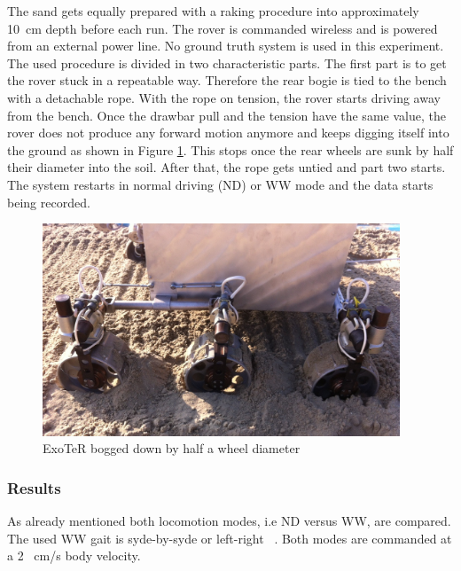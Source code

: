 \documentclass[a4paper,twocolumn]{esapub2005} %
\begin{document}

The sand gets equally prepared with a raking procedure into approximately
10~\unit{cm} depth before each run.  The rover is commanded wireless
and is powered from an external power line. No ground truth system is used in this experiment. The
used procedure is divided in two characteristic parts. The first part is to get
the rover stuck in a repeatable way. Therefore the rear bogie is tied to the
bench with a detachable rope. With the rope on tension, the rover starts
driving away from the bench. Once the drawbar pull and the tension have the
same value, the rover does not produce any forward motion anymore and keeps
digging itself into the ground as shown in Figure \ref{fig:volleyexoterdigg}.
This stops once the rear wheels are sunk by half their diameter into the soil.
After that, the rope gets untied and part two starts. The system restarts in
normal driving (ND) or WW mode and the data starts being recorded. 

\begin{figure}[h!]
    \centering
    \includegraphics[width=0.95\textwidth]{volleyexoterdigg.jpg}
    \caption{ExoTeR bogged down by half a wheel diameter}
    \label{fig:volleyexoterdigg}
\end{figure}

\subsubsection{Results} As already mentioned both locomotion modes, i.e ND
versus WW, are compared. The used WW gait is syde-by-syde or left-right
~\cite{LucWalkingGaits}. Both modes are commanded at a 2 ~\unit{cm/s} body velocity.
\end{document}
